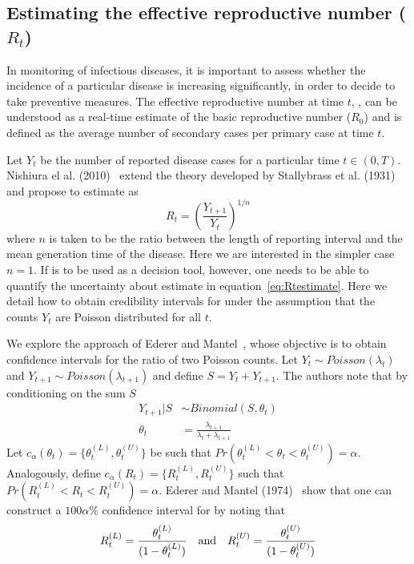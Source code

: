 \subsection*{Estimating the effective reproductive number ($R_t$)}

In monitoring of infectious diseases, it is important to assess whether the 
incidence of a  particular disease is increasing significantly, in order to 
decide to take preventive measures.
The effective reproductive number at time $t$, \rr, can be understood as a 
real-time estimate of the basic reproductive number ($R_{0}$) and is defined as 
the average number of secondary cases per primary case at time $t$.

Let $Y_t$ be the number of reported disease cases for a particular time $t \in 
(0, T)$.
Nishiura el al. (2010)~\cite{nishiura} extend the theory developed by 
Stallybrass et al. (1931)~\cite{stallybrass} and propose to estimate \rr as
\begin{equation}
\label{eq:Rtestimate}
R_t = \left( \frac{Y_{t+1}}{Y_t}\right)^{1/n}
\end{equation}
where $n$ is taken to be the ratio between the length of reporting interval and 
the mean generation time of the disease.
Here we are interested in the simpler case $n=1$.
If \rr is to be used as a decision tool, however, one needs to be able to 
quantify the 
uncertainty about estimate in equation~\ref{eq:Rtestimate}. 
Here we detail how to obtain credibility intervals for \rr under the assumption 
that the counts $Y_t$ are Poisson distributed for all $t$.

We explore the approach of Ederer and Mantel~\cite{mantel}, whose objective is 
to obtain 
confidence intervals for the ratio of two Poisson counts. 
Let $Y_{t} \sim Poisson(\lambda_t)$ and $Y_{t+1} \sim Poisson(\lambda_{t+1})$ 
and define $S = Y_{t} + Y_{t+1}$.
The authors note that by conditioning on the sum $S$
\begin{align}
\label{eq:binlike}
Y_{t+1} | S &\sim Binomial(S, \theta_t) \\
\theta_t &= \frac{\lambda_{t+1}}{\lambda_{t} + \lambda_{t+1}}
\end{align}
Let $c_{\alpha}(\theta_t) = \{\theta_t^{(L)} , \theta_t^{(U)} \}$ be such that 
$Pr(\theta_t^{(L)}<\theta_t <\theta_t^{(U)}) = \alpha$.
Analogously, define $c_{\alpha}(R_t) = \{R_t^{(L)} , R_t^{(U)} \}$ such that 
$Pr(R_t^{(L)}<R_t<R_t^{(U)}) = \alpha$.
Ederer and Mantel (1974)~\cite{mantel} show that one can construct a $100\alpha 
\%$ confidence interval for \rr by noting that
\begin{equation}
\label{eq:confRt}
 R_t^{(L)} = \frac{\theta_t^{(L)}}{(1-\theta_t^{(L)})} \quad \text{and} \quad R_t^{(U)} = \frac{\theta_t^{(U)}}{(1-\theta_t^{(U)})}\nonumber \\
\end{equation}

